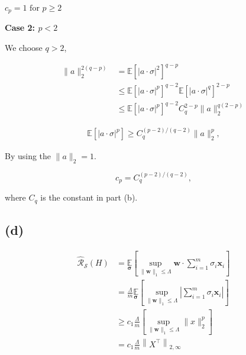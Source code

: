 \documentclass{article}
\begin{document}
$c_p = 1 \text{ for } p\geq2$

\textbf{Case 2: $p < 2$}

We choose $q > 2$,

\begin{equation}
    \begin{aligned}
    \|a\|_{2}^{2(q-p)} &=\mathbb{E}\left[|a \cdot \sigma|^{2}\right]^{q-p} \\
    & \leq \mathbb{E}\left[|a \cdot \sigma|^{p}\right]^{q-2} \mathbb{E}\left[|a \cdot \sigma|^{q}\right]^{2-p} \\
    & \leq \mathbb{E}\left[|a \cdot \sigma|^{p}\right]^{q-2} C_{q}^{2-p}\|a\|_{2}^{q(2-p)}
    \end{aligned}
\end{equation}

\begin{align}
    \mathbb{E}\left[|a \cdot \sigma|^{p}\right] \geq C_{q}^{(p-2)/(q-2)} \|a\|_{2}^{p},
\end{align}

By using the $\|a\|_2 = 1$.

\begin{equation}
    c_{p}=C_{q}^{(p-2) /(q-2)},
\end{equation}

where $C_{q}$ is the constant in part (b).


\subsection{(d)}


\begin{equation}
    \begin{aligned}
    \widehat{\mathcal{R}}_{\mathcal{S}}
    \left(H\right) &=\underset{\boldsymbol{\sigma}}{\mathbb{E}}
    \left[\sup _{\|\mathbf{w}\|_{1} \leq \Lambda} \mathbf{w} \cdot \sum_{i=1}^{m} \sigma_{i} \mathbf{x}_{i}\right] \\
    &=\frac{\Lambda}{m} 
    \underset{\boldsymbol{\sigma}}{\mathbb{E}}
        \left[
            \sup _{\|\mathbf{w}\|_{1} \leq \Lambda}
            \left| \sum_{i=1}^{m} \sigma_{i} \mathbf{x}_{i} \right| 
        \right]\\
    &\geq c_1 \frac{\Lambda}{m} 
    \left[
        \sup _{\|\mathbf{w}\|_{1} \leq \Lambda} \|x\|_{2}^{p} 
    \right] \\
    &= c_1 \frac{\Lambda}{m}\left\|X^{\top}\right\|_{2, \infty} \\
    \end{aligned}
\end{equation}
\end{document}
